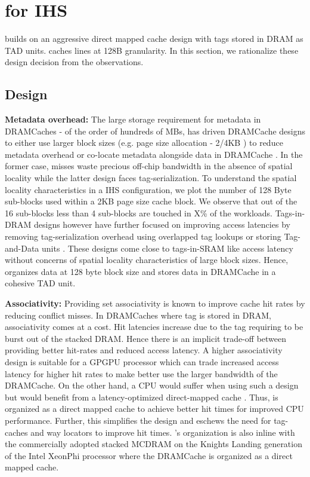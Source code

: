 \section{\cachename for IHS} \label{design}

\cachename builds on an aggressive direct mapped cache design with tags stored in DRAM as TAD units. \cachename caches lines at 128B granularity. In this section, we rationalize these design decision from the observations.

\subsection{\cachename Design} \label{design}

\par \textbf{Metadata overhead:} The large storage requirement for metadata in DRAMCaches - of the order of hundreds of MBs, has driven DRAMCache designs to either use larger block sizes (e.g. page size allocation - 2/4KB \cite{footprint}) to reduce metadata overhead or co-locate metadata alongside data in DRAMCache \cite{loh-hill,alloy,atcache}. In the former case, misses waste precious off-chip bandwidth in the absence of spatial locality while the latter design faces tag-serialization. To understand the spatial locality characteristics in a IHS configuration, we plot the number of 128 Byte sub-blocks used within a 2KB page size cache block. We observe that out of the 16 sub-blocks less than 4 sub-blocks are touched in X\% of the workloads. 
Tags-in-DRAM designs however have further focused on improving access latencies by removing tag-serialization overhead using overlapped tag lookups \cite{loh-hill} or storing Tag-and-Data units \cite{alloy}. These designs come close to tags-in-SRAM like access latency without concerns of spatial locality characteristics of large block sizes. Hence, \cachename organizes data at 128 byte block size and stores data in DRAMCache in a cohesive TAD unit.

\par \textbf{Associativity:} Providing set associativity is known to improve cache hit rates by reducing conflict misses. In DRAMCaches where tag is stored in DRAM,  associativity comes at a cost. Hit latencies increase due to the tag requiring to be burst out of the stacked DRAM. Hence there is an implicit trade-off between providing better hit-rates and reduced access latency. A higher associativity design is suitable for a GPGPU processor which can trade increased access latency for higher hit rates to make better use the larger bandwidth of the DRAMCache. On the other hand, a CPU would suffer when using such a design but would benefit from a latency-optimized direct-mapped cache \cite{alloy}. Thus, \cachename is organized as a direct mapped cache to achieve better hit times for improved CPU performance. Further, this simplifies the design and eschews the need for tag-caches \cite{atcache} and way locators \cite{bimodal} to improve hit times. \cachename's organization is also inline with the commercially adopted stacked MCDRAM on the Knights Landing generation of the Intel XeonPhi processor \cite{xeonphi} where the DRAMCache is organized as a direct mapped cache.

